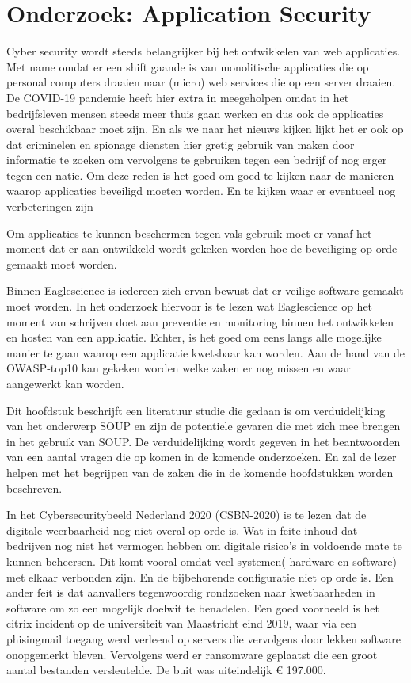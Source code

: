 
\chapter{Onderzoek: Application Security}\label{ch:onderzoek:-application-security}

Cyber security wordt steeds belangrijker bij het ontwikkelen van web applicaties.
Met name omdat er een shift gaande is van monolitische applicaties die op personal computers draaien naar (micro) web services die op een server draaien.
De COVID-19 pandemie heeft hier extra in meegeholpen omdat in het bedrijfsleven mensen steeds meer thuis gaan werken en dus ook de applicaties overal beschikbaar moet zijn.
En als we naar het nieuws kijken lijkt het er ook op dat criminelen en spionage diensten hier gretig gebruik van maken door informatie te zoeken om vervolgens te gebruiken tegen een bedrijf of nog erger tegen een natie.
Om deze reden is het goed om goed te kijken naar de manieren waarop applicaties beveiligd moeten worden. En te kijken waar er eventueel nog verbeteringen zijn


Om applicaties te kunnen beschermen tegen vals gebruik moet er vanaf het moment dat er aan ontwikkeld wordt gekeken worden hoe de beveiliging op orde gemaakt moet worden.

Binnen Eaglescience is iedereen zich ervan bewust dat er veilige software gemaakt moet worden. In het onderzoek hiervoor is te lezen wat Eaglescience op het moment van schrijven doet aan preventie en monitoring binnen het ontwikkelen en hosten van een applicatie. Echter, is het goed om eens langs alle mogelijke manier te gaan waarop een applicatie kwetsbaar kan worden. Aan de hand van de OWASP-top10 kan gekeken worden welke zaken er nog missen en waar aangewerkt kan worden.





Dit hoofdstuk beschrijft een literatuur studie die gedaan is om verduidelijking van het onderwerp SOUP en zijn de potentiele gevaren die met zich mee brengen in het gebruik van SOUP. De verduidelijking wordt gegeven in het beantwoorden van een aantal vragen die op komen in de komende onderzoeken.
En zal de lezer helpen met het begrijpen van de zaken die in de komende hoofdstukken worden beschreven.


In het Cybersecuritybeeld Nederland 2020 (CSBN-2020) is te lezen dat de digitale weerbaarheid nog niet overal op orde is.
Wat in feite inhoud dat bedrijven nog niet het vermogen hebben om digitale risico's in voldoende mate te kunnen beheersen.
Dit komt vooral omdat veel systemen( hardware en software) met elkaar verbonden zijn.
En de bijbehorende configuratie niet op orde is.
Een ander feit is dat aanvallers tegenwoordig rondzoeken naar kwetbaarheden in software om zo een mogelijk doelwit te benadelen.
Een goed voorbeeld is het citrix incident op de universiteit van Maastricht eind 2019, waar via een phisingmail toegang werd verleend op servers die vervolgens door lekken software onopgemerkt bleven.
Vervolgens werd er ransomware geplaatst die een groot aantal bestanden versleutelde.
De buit was uiteindelijk € 197.000.

